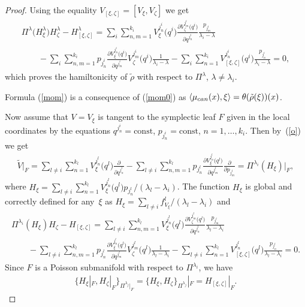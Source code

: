 \documentclass[11pt]{article}
\numberwithin{equation}{section}
\begin{document}
\begin{proof}
Using the equality $V_{[\xi,\zeta]}=[V_\xi,V_\zeta]$ we get
\begin{gather*}
 \Pi^{\lambda} \big(H^\lambda_\xi\big)H^\lambda_\zeta - H^\lambda_{[\xi,\zeta] } =
 \sum_i \sum_{n,m=1}^{k_i}V_\xi^{j^i_n }\big(q^i\big)\frac{\partial V_\zeta^{j^i_m }\big(q^i\big)}{\partial q^{j^i_n } }\frac{p_{j^i_m }}{\lambda_i-\lambda}\\
\qquad {} -\sum_{i} \sum_{n,m=1}^{k_i}p_{j^i_n }\frac{\partial V_\xi^{j^i_n }\big(q^i\big)}{\partial q^{j^i_m }}V_\zeta^{j^i_m }\big(q^i\big)\frac{1}{\lambda_i-\lambda}
 -\sum_i \sum_{n=1}^{k_i}V_{[\xi,\zeta]}^{j^i_n }\big(q^i\big)\frac{p_{j^i_n }}{\lambda_i-\lambda} = 0,
\end{gather*}
which proves the hamiltonicity of $\tilde\rho$ with respect to $\Pi^\lambda$, $\lambda\not=\lambda_i$.

Formula (\ref{mom}) is a consequence of (\ref{mom0}) as $\langle\mu_{\rm can}(x),\xi\rangle=\theta(\tilde\rho(\xi))(x)$.

Now assume that $V=V_\xi$ is tangent to the symplectic leaf $F$ given in the local coordinates by the equations $q^{j^i_n}=\mathrm{const}$, $p_{j^i_n}=\mathrm{const}$, $n=1,\dots,k_i$. Then by~(\ref{o}) we get
\begin{gather*}
\widetilde{V}|_F=\sum_{l\not=i} \sum_{n=1}^{k_l}V_\xi^{j^l_n }\big(q^l\big)\frac{\partial}{\partial q^{j^l_n } }-\sum_{l\not=i} \sum_{n,m=1}^{k_l}p_{j^l_n }\frac{\partial V_\xi^{j^l_n }\big(q^l\big)}{\partial q^{j^l_m }}\frac{\partial }{\partial p_{j^l_m }}=
\Pi^{\lambda_i}(H_\xi)
 \big|_F ,
\end{gather*}
where $H_\xi=\sum\limits_{l\not=i} \sum\limits_{n=1}^{k_l}V_\xi^{j^l_n }\big(q^l\big)p_{j^l_n }/(\lambda_l-\lambda_i)$. The function $H_\xi$ is global and correctly defined for any~$\xi$ as $H_\xi=\sum\limits_{l\not=i} f^l_{V_\xi}/(\lambda_l-\lambda_i)$ and
\begin{gather*}
 \Pi^{\lambda_i} (H_\xi)H_\zeta - H_{[\xi,\zeta] } =
 \sum_{l\not=i} \sum_{n,m=1}^{k_l}V_\xi^{j^l_n }\big(q^l\big)\frac{\partial V_\zeta^{j^l_m }\big(q^l\big)}{\partial q^{j^l_n } }\frac{p_{j^l_m }}{\lambda_l-\lambda_i}\\
 \qquad{} -\sum_{l\not=i} \sum_{n,m=1}^{k_l}p_{j^l_n }\frac{\partial V_\xi^{j^l_n }\big(q^l\big)}{\partial q^{j^l_m }}V_\zeta^{j^l_m }\big(q^l\big)\frac{1}{\lambda_l-\lambda_i}
 -\sum_{l\not=i} \sum_{n=1}^{k_l}V_{[\xi,\zeta]}^{j^l_n }\big(q^l\big)\frac{p_{j^l_n }}{\lambda_l-\lambda_i} = 0.
\end{gather*}
Since $F$ is a Poisson submanifold with respect to $\Pi^{\lambda_i}$, we have
\begin{gather*} \{H_\xi|_F,H_\zeta|_F\}_{\Pi^{\lambda_j}|_F}= \{H_\xi,H_\zeta\}_{\Pi^{\lambda_j}}|_F= H_{[\xi,\zeta] }|_F.\end{gather*}


\end{proof}
\end{document}
